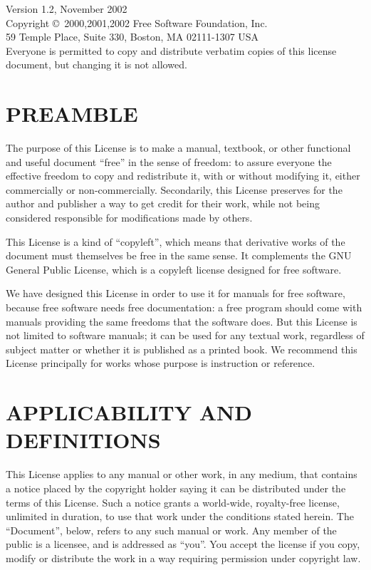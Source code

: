 \documentclass[10pt,a4paper,titlepage,twoside,openright]{report}
\begin{document}
Version 1.2, November 2002 \\
Copyright \copyright\ 2000,2001,2002  Free Software Foundation, Inc.\\
59 Temple Place, Suite 330, Boston, MA  02111-1307  USA\\
Everyone is permitted to copy and distribute verbatim copies
of this license document, but changing it is not allowed.

\section*{PREAMBLE}

The purpose of this License is to make a manual, textbook, or other
functional and useful document ``free'' in the sense of freedom: to
assure everyone the effective freedom to copy and redistribute it,
with or without modifying it, either commercially or non-commercially.
Secondarily, this License preserves for the author and publisher a way
to get credit for their work, while not being considered responsible
for modifications made by others.

This License is a kind of ``copyleft'', which means that derivative
works of the document must themselves be free in the same sense.  It
complements the GNU General Public License, which is a copyleft
license designed for free software.

We have designed this License in order to use it for manuals for free
software, because free software needs free documentation: a free
program should come with manuals providing the same freedoms that the
software does.  But this License is not limited to software manuals;
it can be used for any textual work, regardless of subject matter or
whether it is published as a printed book.  We recommend this License
principally for works whose purpose is instruction or reference.


\section*{APPLICABILITY AND DEFINITIONS}
\label{applicability}

This License applies to any manual or other work, in any medium, that
contains a notice placed by the copyright holder saying it can be
distributed under the terms of this License.  Such a notice grants a
world-wide, royalty-free license, unlimited in duration, to use that
work under the conditions stated herein.  The ``Document'', below,
refers to any such manual or work.  Any member of the public is a
licensee, and is addressed as ``you''.  You accept the license if you
copy, modify or distribute the work in a way requiring permission
under copyright law.
\end{document}
